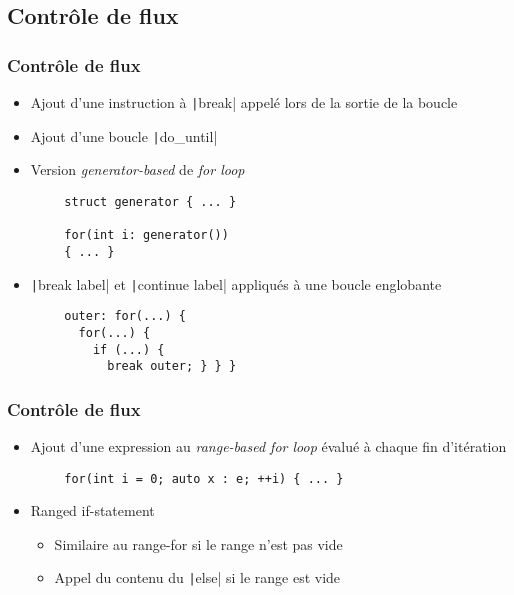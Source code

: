 \documentclass[C++.tex]{subfiles}
\begin{document}
\subsection*{Contrôle de flux}
\begin{frame}[fragile]
	\frametitle{Contrôle de flux}
	\begin{itemize}
		\item Ajout d'une instruction à \texttt|break| appelé lors de la sortie de la boucle


		\item Ajout d'une boucle \texttt|do_until|
		\item Version \textit{generator-based} de \textit{for loop}
	\end{itemize}

	\begin{verbatim}
		struct generator { ... }

		for(int i: generator())
		{ ... }
	\end{verbatim}

	\begin{itemize}
		\item \texttt|break label| et \texttt|continue label| appliqués à une boucle englobante
	\end{itemize}

	\begin{verbatim}
		outer: for(...) {
		  for(...) {
		    if (...) {
		      break outer; } } }
	\end{verbatim}

\end{frame}

\begin{frame}[fragile]
	\frametitle{Contrôle de flux}
	\begin{itemize}
		\item Ajout d'une expression au \textit{range-based for loop} évalué à chaque fin d'itération
	\end{itemize}

	\begin{verbatim}
		for(int i = 0; auto x : e; ++i) { ... }
	\end{verbatim}

	\begin{itemize}
		\item Ranged if-statement
		\begin{itemize}
			\item Similaire au range-for si le range n'est pas vide
			\item Appel du contenu du \texttt|else| si le range est vide
		\end{itemize}
	\end{itemize}

\end{frame}
\end{document}
